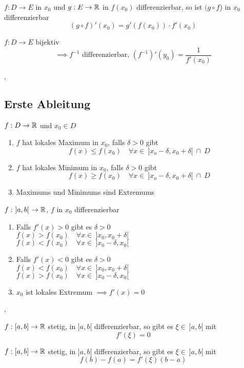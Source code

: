 \Satz[4.1.11] $f: D \rightarrow E$ in $x_0$ und $g: E \rightarrow \mathbb{R}$ in $f(x_0)$ differenzierbar, so ist $(g \circ f$) in $x_0$ differenzierbar
\[ (g \circ f)' (x_0) = g' (f(x_0)) \cdot f'(x_0)  \]

\Korollar[4.1.12] $f : D \rightarrow E$ bijektiv
\[ \implies f^{-1} \text{ differenzierbar, } (f^{-1})' (y_0) = \frac{1}{f'(x_0)}  \]

\sep

\subsection{Erste Ableitung}

\Def[4.2.1] $f: D \rightarrow \mathbb{R}$ und $x_0 \in D$
\begin{enumerate}
\item $f$ hat lokales Maximum in $x_0$, falls $\delta > 0$ gibt
\[ f(x) \leq f(x_0) \quad \forall x \in \ ]x_o - \delta, x_0 + \delta[ \ \cap  \ D\]
\item $f$ hat lokales Minimum in $x_0$, falls $\delta > 0$ gibt
\[ f(x) \geq f(x_0) \quad \forall x \in  \ ]x_o - \delta, x_0 + \delta[ \ \cap  \ D\]
\item Maximums und Minimums sind Extremums
\end{enumerate}

\Satz[4.2.2] $f : \ ]a,b[ \ \rightarrow \mathbb{R}$, $ f \text{ in } x_0$ differenzierbar
\begin{enumerate}
\item Falls $f'(x) > 0$ gibt es $\delta > 0$ \\
$f(x) > f(x_0) \quad \forall x \in \ ]x_0, x_0 + \delta [$ \\
$f(x) < f(x_0) \quad \forall x \in \ ]x_0 - \delta, x_0 [$

\item Falls $f'(x) < 0$ gibt es $\delta > 0$ \\
$f(x) < f(x_0) \quad \forall x \in \ ]x_0, x_0 + \delta [$ \\
$f(x) > f(x_0) \quad \forall x \in \ ]x_0 - \delta, x_0 [$

\item $x_0$ ist lokales Extremum $\implies f'(x) = 0$
\end{enumerate}

\sep 

\Satz[4.2.3] $f : [a,b] \rightarrow \mathbb{R}$ stetig, in $ ]a, b[ $ differenzierbar, so gibt es $\xi \in \ ]a,b[$ mit
\[ f'(\xi) = 0\]

\Satz[4.2.5] $f : [a,b] \rightarrow \mathbb{R}$ stetig, in $ ]a, b[ $ differenzierbar, so gibt es $\xi \in \ ]a,b[$ mit
\[f(b) - f(a) = f'(\xi) (b - a) \]

